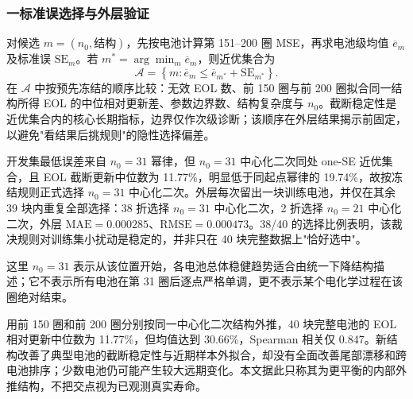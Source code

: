 \documentclass[withoutpreface]{cumcmthesis}
\newcommand{\RMSE}{\mathrm{RMSE}}
\newcommand{\MAE}{\mathrm{MAE}}
\begin{document}
\subsubsection{一标准误选择与外层验证}

对候选 $m=(n_0,\text{结构})$，先按电池计算第 151--200 圈 MSE，再求电池级均值 $\overline e_m$ 及标准误 $\mathrm{SE}_m$。若 $m^*=\arg\min_m\overline e_m$，则近优集合为
\begin{equation}
\mathcal A=\left\{m:\overline e_m\le
\overline e_{m^*}+\mathrm{SE}_{m^*}\right\}.
\end{equation}
在 $\mathcal A$ 中按预先冻结的顺序比较：无效 EOL 数、前 150 圈与前 200 圈拟合同一结构所得 EOL 的中位相对更新差、参数边界数、结构复杂度与 $n_0$。截断稳定性是近优集合内的核心长期指标，边界仅作次级诊断；该顺序在外层结果揭示前固定，以避免"看结果后挑规则"的隐性选择偏差。

\begin{table}[H]
\centering
\caption{稳定起点与退化结构的开发阶段比较}
\label{tab:q1models}
\end{table}

开发集最低误差来自 $n_0=31$ 幂律，但 $n_0=31$ 中心化二次同处 one-SE 近优集合，且 EOL 截断更新中位数为 11.77\%，明显低于同起点幂律的 19.74\%，故按冻结规则正式选择 $n_0=31$ 中心化二次。外层每次留出一块训练电池，并仅在其余 39 块内重复全部选择：38 折选择 $n_0=31$ 中心化二次，2 折选择 $n_0=21$ 中心化二次，外层 $\MAE=0.000285$、$\RMSE=0.000473$。38/40 的选择比例表明，该裁决规则对训练集小扰动是稳定的，并非只在 40 块完整数据上"恰好选中"。

这里 $n_0=31$ 表示从该位置开始，各电池总体稳健趋势适合由统一下降结构描述；它不表示所有电池在第 31 圈后逐点严格单调，更不表示某个电化学过程在该圈绝对结束。

用前 150 圈和前 200 圈分别按同一中心化二次结构外推，40 块完整电池的 EOL 相对更新中位数为 11.77\%，但均值达到 30.66\%，Spearman 相关仅 0.847。新结构改善了典型电池的截断稳定性与近期样本外拟合，却没有全面改善尾部漂移和跨电池排序；少数电池仍可能产生较大远期变化。本文据此只称其为更平衡的内部外推结构，不把交点视为已观测真实寿命。
\end{document}
